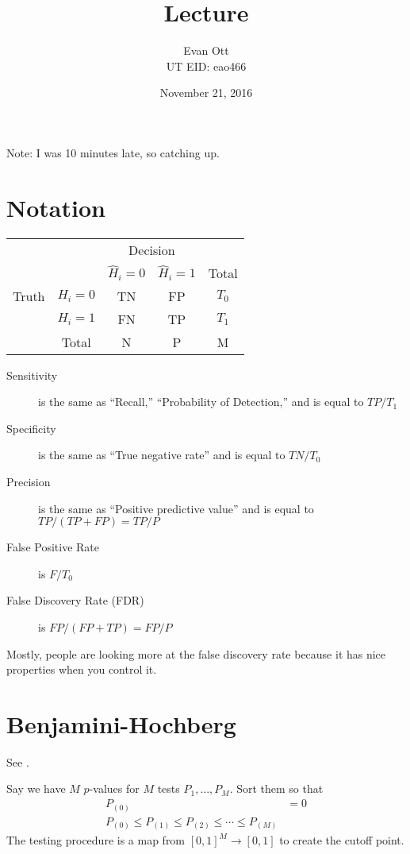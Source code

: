 \documentclass{article}
\title{\vspace{-6ex}Lecture\vspace{-2ex}}
\author{Evan Ott \\ UT EID: eao466\vspace{-2ex}}
\date{November 21, 2016}
\begin{document}
\maketitle

Note: I was 10 minutes late, so catching up.

\section{Notation}

\begin{center}
\begin{tabular}{cc|c|c|c}
& & \multicolumn{2}{c|}{Decision} & \\ 
\multirow{ 3}{*}{Truth}  & & $\hat{H}_i=0$ & $\hat{H}_i=1$ & Total \\
\hline
 & $H_i=0$ & TN & FP & $T_0$\\
 & $H_i=1$ & FN & TP & $T_1$\\
 \hline
 & Total & N & P & M
\end{tabular}
\end{center}

\vspace{3ex}

\begin{description}
\item[Sensitivity] is the same as ``Recall,'' ``Probability of Detection,'' and is equal to $TP/T_1$
\item[Specificity] is the same as ``True negative rate'' and is equal to $TN/T_0$
\item[Precision] is the same as ``Positive predictive value'' and is equal to $TP/(TP+FP)=TP/P$
\item[False Positive Rate] is $F/T_0$
\item[False Discovery Rate (FDR)] is $FP/(FP+TP)=FP/P$
\end{description}

Mostly, people are looking more at the false discovery rate because it has nice properties when you control it.

\section{Benjamini-Hochberg}
See \citep{benjamini1995controlling}.

Say we have $M$ $p$-values for $M$ tests $P_1, \ldots, P_M$. Sort them so that
\begin{align*}
P_{(0)}&=0\\
P_{(0)} \leq P_{(1)} \leq P_{(2)} \leq \cdots \leq P_{(M)} 
\end{align*}
The testing procedure is a map from $[0,1]^M \rightarrow [0,1]$ to create the cutoff point.
\end{document}
